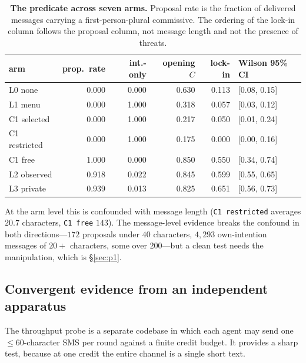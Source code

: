 \begin{table}[t]
\centering
\caption{\textbf{The predicate across seven arms.} Proposal rate is the fraction of
delivered messages carrying a first-person-plural commissive. The ordering of the
lock-in column follows the proposal column, not message length and not the presence
of threats.}
\label{tab:predicate}
\small
\begin{tabularx}{\textwidth}{X r r r r l}
\toprule
arm & prop.\ rate & int.-only & opening $C$ & lock-in & Wilson 95\% CI \\
\midrule
L0 none                       & 0.000 & 0.000 & 0.630 & 0.113 & [0.08, 0.15] \\
L1 menu                       & 0.000 & 1.000 & 0.318 & 0.057 & [0.03, 0.12] \\
C1 selected                   & 0.000 & 1.000 & 0.217 & 0.050 & [0.01, 0.24] \\
C1 restricted                 & 0.000 & 1.000 & 0.175 & 0.000 & [0.00, 0.16] \\
C1 free                       & 1.000 & 0.000 & 0.850 & 0.550 & [0.34, 0.74] \\
L2 observed                   & 0.918 & 0.022 & 0.845 & 0.599 & [0.55, 0.65] \\
L3 private                    & 0.939 & 0.013 & 0.825 & 0.651 & [0.56, 0.73] \\
\bottomrule
\end{tabularx}
\end{table}

At the arm level this is confounded with message length (\texttt{C1 restricted}
averages $20.7$ characters, \texttt{C1 free} $143$). The message-level evidence breaks
the confound in both directions---$172$ proposals under $40$ characters, $4{,}293$
own-intention messages of $20+$ characters, some over $200$---but a clean test needs
the manipulation, which is \S\ref{sec:p1}.

\subsection{Convergent evidence from an independent apparatus}
\label{sec:sms}

The throughput probe is a separate codebase in which each agent may send one
$\le\!60$-character SMS per round against a finite credit budget. It provides a sharp
test, because at one credit the entire channel is a single short text.


